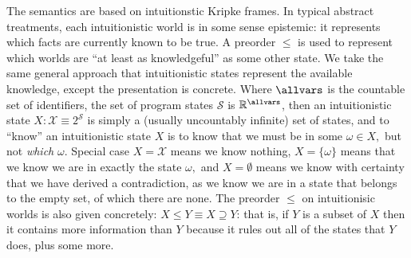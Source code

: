 \documentclass[12pt]{cmuthesis}
\theoremstyle{definition}
\theoremstyle{remark}
\newcommand{\allstate}{\mathcal{S}}
\newcommand{\allregion}{\mathcal{X}}
\begin{document}
The semantics are based on intuitionstic Kripke frames.
In typical abstract treatments, each intuitionistic world is in some sense epistemic: it represents which facts are currently known to be true.
A preorder $\leq$ is used to represent which worlds are ``at least as knowledgeful'' as some other state.
We take the same general approach that intuitionistic states represent the available knowledge, except the presentation is concrete.
\newcommand{\allcon}{\allregion}
\newcommand{\somesemi}[2]{\epsilon #1~|~#2}
Where $\allvars$ is the countable set of identifiers, the set of program states $\allstate$ is $\mathbb{R}^\allvars$, then an intuitionistic state $X : \allcon \equiv 2^\allstate$ is simply a (usually uncountably infinite) set of states, and to ``know'' an intuitionistic state $X$ is to know that we must be in some $\omega \in X,$ but not \emph{which} $\omega$.
Special case $X = \allcon$ means we know nothing, $X = \{\omega\}$ means that we know we are in exactly the state $\omega,$ and $X = \emptyset$ means we know with certainty that we have derived a contradiction, as we know we are in a state that belongs to the empty set, of which there are none.
The preorder $\leq$ on intuitionisic worlds is also given concretely: $X \leq Y \equiv X \supseteq Y$: that is, if $Y$ is a subset of $X$ then it contains more information than $Y$ because it rules out all of the states that $Y$ does, plus some more.

\end{document}
